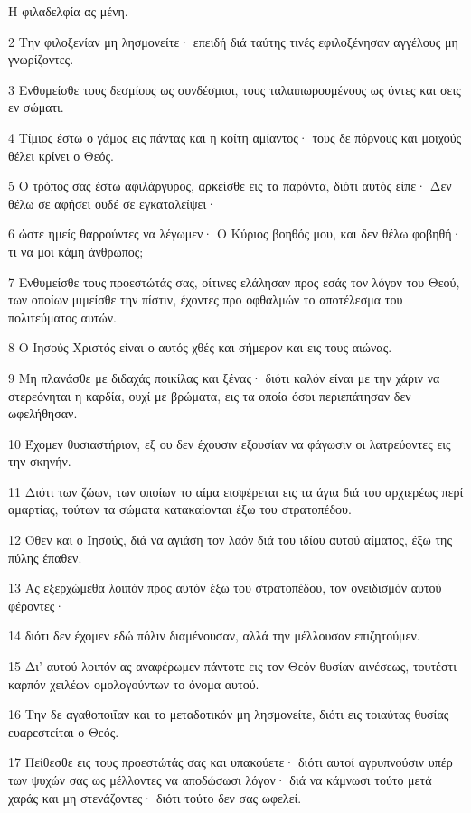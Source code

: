 \par Η φιλαδελφία ας μένη.
\par 2 Την φιλοξενίαν μη λησμονείτε· επειδή διά ταύτης τινές εφιλοξένησαν αγγέλους μη γνωρίζοντες.
\par 3 Ενθυμείσθε τους δεσμίους ως συνδέσμιοι, τους ταλαιπωρουμένους ως όντες και σεις εν σώματι.
\par 4 Τίμιος έστω ο γάμος εις πάντας και η κοίτη αμίαντος· τους δε πόρνους και μοιχούς θέλει κρίνει ο Θεός.
\par 5 Ο τρόπος σας έστω αφιλάργυρος, αρκείσθε εις τα παρόντα, διότι αυτός είπε· Δεν θέλω σε αφήσει ουδέ σε εγκαταλείψει·
\par 6 ώστε ημείς θαρρούντες να λέγωμεν· Ο Κύριος βοηθός μου, και δεν θέλω φοβηθή· τι να μοι κάμη άνθρωπος;
\par 7 Ενθυμείσθε τους προεστώτάς σας, οίτινες ελάλησαν προς εσάς τον λόγον του Θεού, των οποίων μιμείσθε την πίστιν, έχοντες προ οφθαλμών το αποτέλεσμα του πολιτεύματος αυτών.
\par 8 Ο Ιησούς Χριστός είναι ο αυτός χθές και σήμερον και εις τους αιώνας.
\par 9 Μη πλανάσθε με διδαχάς ποικίλας και ξένας· διότι καλόν είναι με την χάριν να στερεόνηται η καρδία, ουχί με βρώματα, εις τα οποία όσοι περιεπάτησαν δεν ωφελήθησαν.
\par 10 Έχομεν θυσιαστήριον, εξ ου δεν έχουσιν εξουσίαν να φάγωσιν οι λατρεύοντες εις την σκηνήν.
\par 11 Διότι των ζώων, των οποίων το αίμα εισφέρεται εις τα άγια διά του αρχιερέως περί αμαρτίας, τούτων τα σώματα κατακαίονται έξω του στρατοπέδου.
\par 12 Όθεν και ο Ιησούς, διά να αγιάση τον λαόν διά του ιδίου αυτού αίματος, έξω της πύλης έπαθεν.
\par 13 Ας εξερχώμεθα λοιπόν προς αυτόν έξω του στρατοπέδου, τον ονειδισμόν αυτού φέροντες·
\par 14 διότι δεν έχομεν εδώ πόλιν διαμένουσαν, αλλά την μέλλουσαν επιζητούμεν.
\par 15 Δι' αυτού λοιπόν ας αναφέρωμεν πάντοτε εις τον Θεόν θυσίαν αινέσεως, τουτέστι καρπόν χειλέων ομολογούντων το όνομα αυτού.
\par 16 Την δε αγαθοποιΐαν και το μεταδοτικόν μη λησμονείτε, διότι εις τοιαύτας θυσίας ευαρεστείται ο Θεός.
\par 17 Πείθεσθε εις τους προεστώτάς σας και υπακούετε· διότι αυτοί αγρυπνούσιν υπέρ των ψυχών σας ως μέλλοντες να αποδώσωσι λόγον· διά να κάμνωσι τούτο μετά χαράς και μη στενάζοντες· διότι τούτο δεν σας ωφελεί.
